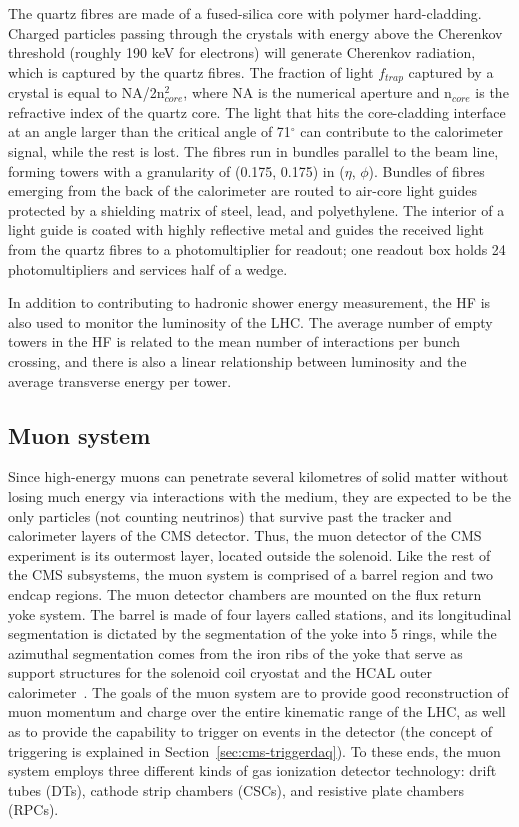 The quartz fibres are made of a fused-silica core with polymer hard-cladding. Charged particles passing through the crystals with energy above the Cherenkov threshold (roughly 190 keV for electrons) will generate Cherenkov radiation, which is captured by the quartz fibres. The fraction of light $f_{trap}$ captured by a crystal is equal to NA/2n$_{core}^2$, where NA is the numerical aperture and n$_{core}$ is the refractive index of the quartz core. The light that hits the core-cladding interface at an angle larger than the critical angle of 71$^{\circ}$ can contribute to the calorimeter signal, while the rest is lost. The fibres run in bundles parallel to the beam line, forming towers with a granularity of (0.175, 0.175) in ($\eta$, $\phi$). Bundles of fibres emerging from the back of the calorimeter are routed to air-core light guides protected by a shielding matrix of steel, lead, and polyethylene. The interior of a light guide is coated with highly reflective metal and guides the received light from the quartz fibres to a photomultiplier for readout; one readout box holds 24 photomultipliers and services half of a wedge.

In addition to contributing to hadronic shower energy measurement, the HF is also used to monitor the luminosity of the LHC. The average number of empty towers in the HF is related to the mean number of interactions per bunch crossing, and there is also a linear relationship between luminosity and the average transverse energy per tower.

\subsection{Muon system\label{sec:cms-muon}}
Since high-energy muons can penetrate several kilometres of solid matter without losing much energy via interactions with the medium, they are expected to be the only particles (not counting neutrinos) that survive past the tracker and calorimeter layers of the CMS detector. Thus, the muon detector of the CMS experiment is its outermost layer, located outside the solenoid. Like the rest of the CMS subsystems, the muon system is comprised of a barrel region and two endcap regions. The muon detector chambers are mounted on the flux return yoke system. The barrel is made of four layers called stations, and its longitudinal segmentation is dictated by the segmentation of the yoke into 5 rings, while the azimuthal segmentation comes from the iron ribs of the yoke that serve as support structures for the solenoid coil cryostat and the HCAL outer calorimeter~\cite{MuonTDR}. The goals of the muon system are to provide good reconstruction of muon momentum and charge over the entire kinematic range of the LHC, as well as to provide the capability to trigger on events in the detector (the concept of triggering is explained in Section~\ref{sec:cms-triggerdaq}). To these ends, the muon system employs three different kinds of gas ionization detector technology: drift tubes (DTs), cathode strip chambers (CSCs), and resistive plate chambers (RPCs).

